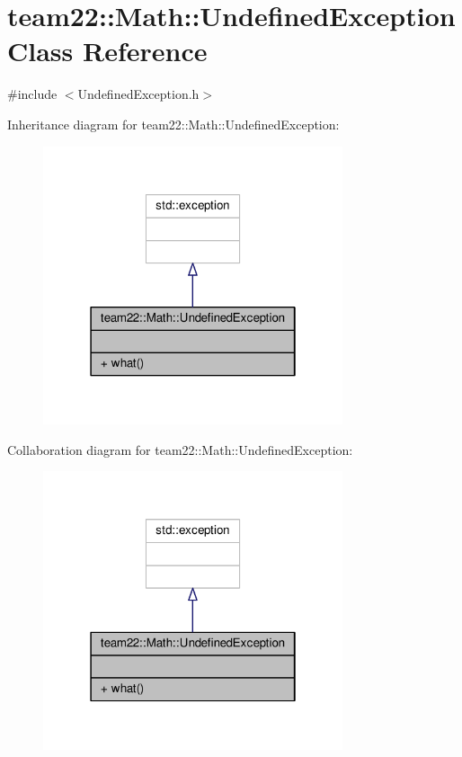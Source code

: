 \hypertarget{classteam22_1_1_math_1_1_undefined_exception}{}\section{team22\+:\+:Math\+:\+:Undefined\+Exception Class Reference}
\label{classteam22_1_1_math_1_1_undefined_exception}


{\ttfamily \#include $<$Undefined\+Exception.\+h$>$}



Inheritance diagram for team22\+:\+:Math\+:\+:Undefined\+Exception\+:
\nopagebreak
\begin{figure}[H]
\begin{center}
\leavevmode
\includegraphics[width=250pt]{classteam22_1_1_math_1_1_undefined_exception__inherit__graph}
\end{center}
\end{figure}


Collaboration diagram for team22\+:\+:Math\+:\+:Undefined\+Exception\+:
\nopagebreak
\begin{figure}[H]
\begin{center}
\leavevmode
\includegraphics[width=250pt]{classteam22_1_1_math_1_1_undefined_exception__coll__graph}
\end{center}
\end{figure}
